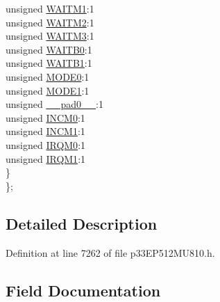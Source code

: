 \begin{DoxyCompactItemize}
\begin{tabbing}
\>\>unsigned \hyperlink{structtag_p_m_m_o_d_e_b_i_t_s_a112a429c73fadacc0889457859bc7dc6}{WAITM1}:1\\
\>\>unsigned \hyperlink{structtag_p_m_m_o_d_e_b_i_t_s_ad7f77d6f0db3dcef90dc51ddc92bb0ac}{WAITM2}:1\\
\>\>unsigned \hyperlink{structtag_p_m_m_o_d_e_b_i_t_s_a40b07e066e9763a7da1a8aef1b87fc93}{WAITM3}:1\\
\>\>unsigned \hyperlink{structtag_p_m_m_o_d_e_b_i_t_s_a59f0bbb52d09ca87f5effa062b8d89c3}{WAITB0}:1\\
\>\>unsigned \hyperlink{structtag_p_m_m_o_d_e_b_i_t_s_a1cf28a409597c877cf6fe50963e844b7}{WAITB1}:1\\
\>\>unsigned \hyperlink{structtag_p_m_m_o_d_e_b_i_t_s_abc938903e74bff48935569d0c5b19035}{MODE0}:1\\
\>\>unsigned \hyperlink{structtag_p_m_m_o_d_e_b_i_t_s_a7a9f7514566d0626724ce6c4b81b5ea2}{MODE1}:1\\
\>\>unsigned \hyperlink{structtag_p_m_m_o_d_e_b_i_t_s_adf71f3d8410c1f1dbbc96680a92c49af}{\_\_pad0\_\_}:1\\
\>\>unsigned \hyperlink{structtag_p_m_m_o_d_e_b_i_t_s_af1a1bd1e7080b900ce8ba8e7dd919578}{INCM0}:1\\
\>\>unsigned \hyperlink{structtag_p_m_m_o_d_e_b_i_t_s_a15696027c82c357f7c1a6a0d039d0b81}{INCM1}:1\\
\>\>unsigned \hyperlink{structtag_p_m_m_o_d_e_b_i_t_s_a2a774a391289f25860213e290f606ab7}{IRQM0}:1\\
\>\>unsigned \hyperlink{structtag_p_m_m_o_d_e_b_i_t_s_a7ab9dbf87f53955127bac8893733c626}{IRQM1}:1\\
\>\} \\
\}; \\

\end{tabbing}\end{DoxyCompactItemize}


\subsection{Detailed Description}


Definition at line 7262 of file p33\+E\+P512\+M\+U810.\+h.



\subsection{Field Documentation}
\mbox{\label{structtag_p_m_m_o_d_e_b_i_t_s_aaa6389779b3535472def1a77176f9965}} 
